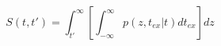 \begin{equation}
S(t,t') = \int_{t'}^{\infty} \left[ \int_{-\infty}^\infty p(z,t_{ex}|t) dt_{ex}\right] dz 
\end{equation}